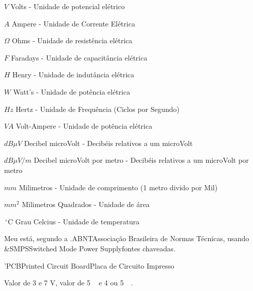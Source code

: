 \begin{simbolos}
   \item[$V$] Volts - Unidade de potencial elétrico
   \item[$A$] Ampere - Unidade de Corrente Elétrica
   \item[$\Omega$] Ohms - Unidade de resistência elétrica
   \item[$F$] Faradays - Unidade de capacitância elétrica
   \item[$H$] Henry - Unidade de indutância elétrica
   \item[$W$] Watt's - Unidade de potência elétrica
   \item[$Hz$] Hertz - Unidade de Frequência (Ciclos por Segundo)
   \item[$VA$] Volt-Ampere - Unidade de potência elétrica
   \item[$dB\mu V$] Decibel microVolt - Decibéis relativos a um microVolt
   \item[$dB\mu V/m$] Decibel microVolt por metro - Decibéis relativos a um microVolt por metro
   \item[$mm$] Milimetros - Unidade de comprimento (1 metro divido por Mil)
   \item[$mm^{2}$] Milimetros Quadrados - Unidade de área
   \item[$\,^{\circ}\mathrm{C}$] Grau Celcius - Unidade de temperatura
\end{simbolos}



Meu  está, segundo a \abreviatura.{ABNT}{Associação Brasileira de Normas Técnicas}, usando \abreviatura&{SMPS}{Switched Mode Power Supply}{fontes chaveadas}. 

\abreviatura'{PCB}{Printed Circuit Board}{Placa de Circuito Impresso}


Valor de 3  e 
7 \si{\volt},
valor de 5 \si{\micro{}} e
4 
ou \SI{5}{\milli{}}.


